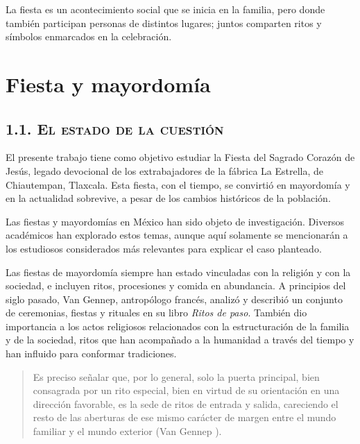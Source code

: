 \documentclass[14pt,letterpaper,twoside]{extbook} %
\begin{document}
La fiesta es un acontecimiento social que se inicia en la familia, pero donde también participan personas de distintos lugares; juntos comparten ritos y símbolos enmarcados en la celebración.

\chapter{\mdseries Fiesta y mayordomía}\label{Capitulo_1}
\pagestyle{fancy}
\fancyhf{}
\fancyfoot[RO,LE]{\hfill \thepage \hfill}

\section*{\mdseries\large\textsc{1.1. El estado de la cuestión}}

\noindent El presente trabajo tiene como objetivo estudiar la Fiesta del Sagrado Corazón de Jesús, legado devocional de los extrabajadores de la fábrica La Estrella, de Chiautempan, Tlaxcala. Esta fiesta, con el tiempo, se convirtió en mayordomía y en la actualidad sobrevive, a pesar de los cambios históricos de la población.

Las fiestas y mayordomías en México han sido objeto de investigación. Diversos académicos han explorado estos temas, aunque aquí solamente se mencionarán a los estudiosos considerados más relevantes para explicar el caso planteado.

Las fiestas de mayordomía siempre han estado vinculadas con la religión y con la sociedad, e incluyen ritos, procesiones y comida en abundancia. A principios del siglo pasado, Van Gennep, antropólogo francés, analizó y describió un conjunto de ceremonias, fiestas y rituales en su libro \emph{Ritos de paso}. También dio importancia a los actos religiosos relacionados con la estructuración de la familia y de la sociedad, ritos que han acompañado a la humanidad a través del tiempo y han influido para conformar tradiciones.

\begin{quotation}
\noindent Es preciso señalar que, por lo general, solo la puerta principal, bien consagrada por un rito especial, bien en virtud de su orientación en una dirección favorable, es la sede de ritos de entrada y salida, careciendo el resto de las aberturas de ese mismo carácter de margen entre el mundo familiar y el mundo exterior (Van Gennep ).
\end{quotation}
\end{document}
